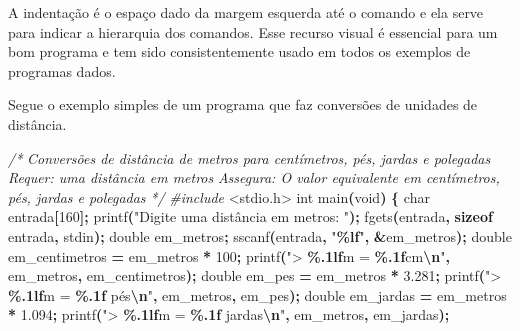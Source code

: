\documentclass[
  11pt,
  a4paper,
]{scrbook}
\newenvironment{Shaded}{\begin{snugshade}}{\end{snugshade}}
\newcommand{\CommentTok}[1]{\textcolor[rgb]{0.56,0.35,0.01}{\textit{#1}}}
\newcommand{\DataTypeTok}[1]{\textcolor[rgb]{0.13,0.29,0.53}{#1}}
\newcommand{\DecValTok}[1]{\textcolor[rgb]{0.00,0.00,0.81}{#1}}
\newcommand{\FloatTok}[1]{\textcolor[rgb]{0.00,0.00,0.81}{#1}}
\newcommand{\ImportTok}[1]{#1}
\newcommand{\KeywordTok}[1]{\textcolor[rgb]{0.13,0.29,0.53}{\textbf{#1}}}
\newcommand{\NormalTok}[1]{#1}
\newcommand{\OperatorTok}[1]{\textcolor[rgb]{0.81,0.36,0.00}{\textbf{#1}}}
\newcommand{\PreprocessorTok}[1]{\textcolor[rgb]{0.56,0.35,0.01}{\textit{#1}}}
\newcommand{\SpecialCharTok}[1]{\textcolor[rgb]{0.81,0.36,0.00}{\textbf{#1}}}
\newcommand{\StringTok}[1]{\textcolor[rgb]{0.31,0.60,0.02}{#1}}
\begin{document}
A indentação é o espaço dado da margem esquerda até o comando e ela
serve para indicar a hierarquia dos comandos. Esse recurso visual é
essencial para um bom programa e tem sido consistentemente usado em
todos os exemplos de programas dados.

Segue o exemplo simples de um programa que faz conversões de unidades de
distância.

\begin{Shaded}
\begin{Highlighting}[]
\CommentTok{/*}
\CommentTok{Conversões de distância de metros para centímetros, pés, jardas e polegadas}
\CommentTok{Requer: uma distância em metros}
\CommentTok{Assegura: O valor equivalente em centímetros, pés, jardas e polegadas}
\CommentTok{*/}
\PreprocessorTok{\#include }\ImportTok{\textless{}stdio.h\textgreater{}}
\DataTypeTok{int}\NormalTok{ main}\OperatorTok{(}\DataTypeTok{void}\OperatorTok{)} \OperatorTok{\{}
\DataTypeTok{char}\NormalTok{ entrada}\OperatorTok{[}\DecValTok{160}\OperatorTok{];}
\NormalTok{printf}\OperatorTok{(}\StringTok{"Digite uma distância em metros: "}\OperatorTok{);}
\NormalTok{fgets}\OperatorTok{(}\NormalTok{entrada}\OperatorTok{,} \KeywordTok{sizeof}\NormalTok{ entrada}\OperatorTok{,}\NormalTok{ stdin}\OperatorTok{);}
\DataTypeTok{double}\NormalTok{ em\_metros}\OperatorTok{;}
\NormalTok{sscanf}\OperatorTok{(}\NormalTok{entrada}\OperatorTok{,} \StringTok{"}\SpecialCharTok{\%lf}\StringTok{"}\OperatorTok{,} \OperatorTok{\&}\NormalTok{em\_metros}\OperatorTok{);}
\DataTypeTok{double}\NormalTok{ em\_centimetros }\OperatorTok{=}\NormalTok{ em\_metros }\OperatorTok{*} \DecValTok{100}\OperatorTok{;}
\NormalTok{printf}\OperatorTok{(}\StringTok{"\textgreater{} }\SpecialCharTok{\%.1lf}\StringTok{m = }\SpecialCharTok{\%.1f}\StringTok{cm}\SpecialCharTok{\textbackslash{}n}\StringTok{"}\OperatorTok{,}\NormalTok{ em\_metros}\OperatorTok{,}\NormalTok{ em\_centimetros}\OperatorTok{);}
\DataTypeTok{double}\NormalTok{ em\_pes }\OperatorTok{=}\NormalTok{ em\_metros }\OperatorTok{*} \FloatTok{3.281}\OperatorTok{;}
\NormalTok{printf}\OperatorTok{(}\StringTok{"\textgreater{} }\SpecialCharTok{\%.1lf}\StringTok{m = }\SpecialCharTok{\%.1f}\StringTok{ pés}\SpecialCharTok{\textbackslash{}n}\StringTok{"}\OperatorTok{,}\NormalTok{ em\_metros}\OperatorTok{,}\NormalTok{ em\_pes}\OperatorTok{);}
\DataTypeTok{double}\NormalTok{ em\_jardas }\OperatorTok{=}\NormalTok{ em\_metros }\OperatorTok{*} \FloatTok{1.094}\OperatorTok{;}
\NormalTok{printf}\OperatorTok{(}\StringTok{"\textgreater{} }\SpecialCharTok{\%.1lf}\StringTok{m = }\SpecialCharTok{\%.1f}\StringTok{ jardas}\SpecialCharTok{\textbackslash{}n}\StringTok{"}\OperatorTok{,}\NormalTok{ em\_metros}\OperatorTok{,}\NormalTok{ em\_jardas}\OperatorTok{);}

\end{Highlighting}
\end{Shaded}
\end{document}
